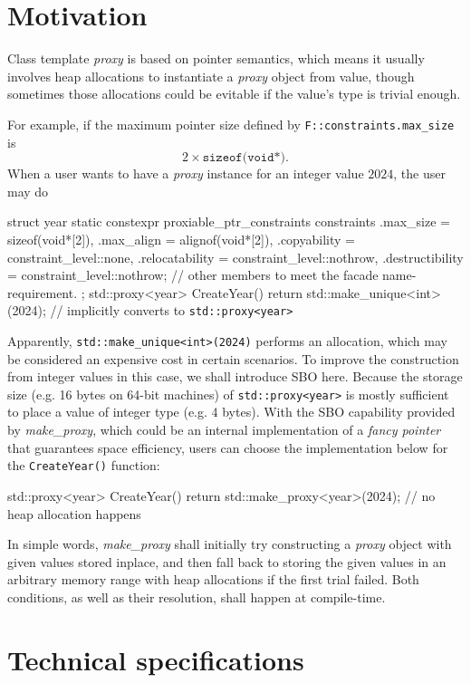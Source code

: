 \documentclass[10pt, a4paper, oneside]{article}
\begin{document}
\section{Motivation}
Class template \textit{proxy} is based on pointer semantics,
which means it usually involves heap allocations to instantiate a \textit{proxy} object from value,
though sometimes those allocations could be evitable if the value's type is trivial enough.

For example, if the maximum pointer size defined by \verb|F::constraints.max_size| is
\begin{equation*}
2 \times \texttt{sizeof(void*)}.
\end{equation*}
When a user wants to have a \textit{proxy} instance for an integer value $2024$, the user may do
\begin{codeblock}
struct year {
  static constexpr proxiable_ptr_constraints constraints{
    .max_size = sizeof(void*[2]),
    .max_align = alignof(void*[2]),
    .copyability = constraint_level::none,
    .relocatability = constraint_level::nothrow,
    .destructibility = constraint_level::nothrow};
  // other members to meet the facade name-requirement.
};
std::proxy<year> CreateYear() {
  return std::make_unique<int>(2024);  // implicitly converts to \verb|std::proxy<year>|
}
\end{codeblock}
Apparently, \verb|std::make_unique<int>(2024)| performs an allocation,
which may be considered an expensive cost in certain scenarios.
To improve the construction from integer values in this case,
we shall introduce SBO here.
Because the storage size (e.g. 16 bytes on 64-bit machines) of \verb|std::proxy<year>| is mostly sufficient to place a value of integer type (e.g. 4 bytes).
With the SBO capability provided by \textit{make\_proxy}, which could be an internal implementation of a \textit{fancy pointer} that guarantees space efficiency,
users can choose the implementation below for the \verb|CreateYear()| function:
\begin{codeblock}
std::proxy<year> CreateYear() {
  return std::make_proxy<year>(2024);  // no heap allocation happens
}
\end{codeblock}
In simple words,
\textit{make\_proxy} shall initially try constructing a \textit{proxy} object with given values stored inplace,
and then fall back to storing the given values in an arbitrary memory range with heap allocations if the first trial failed.
Both conditions, as well as their resolution, shall happen at compile-time.

\section{Technical specifications}
\end{document}
